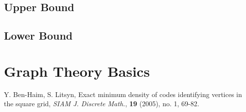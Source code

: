 \documentclass[12pt]{report}
\numberwithin{equation}{chapter}
\theoremstyle{definition}
\theoremstyle{remark}
\begin{document}
\section{Upper Bound}




\section{Lower Bound}



\appendix
\chapter{Graph Theory Basics}
\label{graphtheory}


  





\clearpage
{}
\begin{thebibliography}{9}

Y. Ben-Haim, S. Litsyn, Exact minimum density of codes identifying vertices in the square grid,
\emph{SIAM J. Discrete Math.}, 
{\bf 19} (2005), no. 1, 69-82.



\end{thebibliography}
\end{document}
